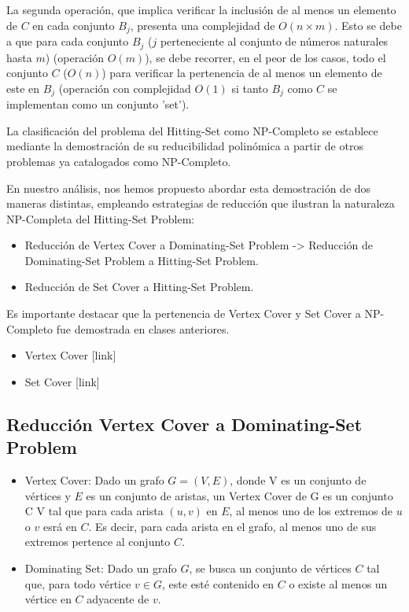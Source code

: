 La segunda operación, que implica verificar la inclusión de al menos un elemento de $C$ 
en cada conjunto $B_{j}$, presenta una complejidad de $O(n \times m)$. Esto se debe a 
que para cada conjunto $B_{j}$ ($j$ perteneciente al conjunto de números naturales hasta 
$m$) (operación $O(m)$), se debe recorrer, en el peor de los casos, todo el conjunto $C$ 
($O(n)$) para verificar la pertenencia de al menos un elemento de este en $B_{j}$ 
(operación con complejidad $O(1)$ si tanto $B_{j}$ como $C$ se implementan como un conjunto 'set').

La clasificación del problema del Hitting-Set como NP-Completo se establece mediante la demostración
de su reducibilidad polinómica a partir de otros problemas ya catalogados como NP-Completo. 

En nuestro análisis, nos hemos propuesto abordar esta demostración de dos maneras distintas, 
empleando estrategias de reducción que ilustran la naturaleza NP-Completa del Hitting-Set Problem:

\begin{itemize}
    \item Reducción de Vertex Cover a Dominating-Set Problem -> Reducción de Dominating-Set Problem a Hitting-Set Problem.
    \item Reducción de Set Cover a Hitting-Set Problem.
\end{itemize}


Es importante destacar que la pertenencia de Vertex Cover y Set Cover a NP-Completo fue demostrada en clases anteriores.
\begin{itemize}
    \item  Vertex Cover [link]
    \item Set Cover [link]
\end{itemize}


\subsection{Reducción Vertex Cover a Dominating-Set Problem}

\begin{itemize}
    \item Vertex Cover: Dado un grafo $G=(V,E)$, donde V es un conjunto de vértices y $E$ es un conjunto de aristas, un Vertex Cover de G es un conjunto C \in V tal que para cada arista $(u,v)$ en $E$, al menos uno de los extremos de $u$ o $v$ esrá en $C$. Es decir, para cada arista en el grafo, al menos uno de sus extremos pertence al conjunto $C$. 
    \item Dominating Set: Dado un grafo $G$, se busca un conjunto de vértices $C$
    tal que, para todo vértice $v \in G$, este esté contenido en $C$ o existe al menos un vértice en $C$ adyacente de $v$.
\end{itemize}

